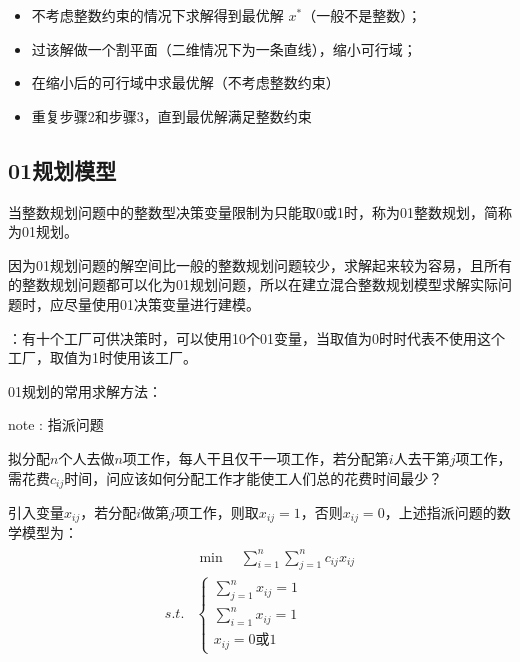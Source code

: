 \documentclass[letterpaper,10pt,english]{sphinxmanual}
\begin{document}
\begin{itemize}
\item {} 
不考虑整数约束的情况下求解得到最优解 \(x^*\)（一般不是整数）；

\item {} 
过该解做一个割平面（二维情况下为一条直线），缩小可行域；

\item {} 
在缩小后的可行域中求最优解（不考虑整数约束）

\item {} 
重复步骤2和步骤3，直到最优解满足整数约束

\end{itemize}



\subsection{0\sphinxhyphen{}1规划模型}
\label{\detokenize{docs/LP:id12}}
当整数规划问题中的整数型决策变量限制为只能取0或1时，称为0\sphinxhyphen{}1整数规划，简称为0\sphinxhyphen{}1规划。

因为0\sphinxhyphen{}1规划问题的解空间比一般的整数规划问题较少，求解起来较为容易，且所有的整数规划问题都可以化为0\sphinxhyphen{}1规划问题，所以在建立混合整数规划模型求解实际问题时，应尽量使用0\sphinxhyphen{}1决策变量进行建模。

：有十个工厂可供决策时，可以使用10个0\sphinxhyphen{}1变量，当取值为0时时代表不使用这个工厂，取值为1时使用该工厂。

0\sphinxhyphen{}1规划的常用求解方法：

\begin{sphinxadmonition}{note}{ : 指派问题}

拟分配\(n\)个人去做\(n\)项工作，每人干且仅干一项工作，若分配第\(i\)人去干第\(j\)项工作，需花费\(c_{ij}\)时间，问应该如何分配工作才能使工人们总的花费时间最少？
\end{sphinxadmonition}

 引入变量\(x_{ij}\)，若分配\(i\)做第\(j\)项工作，则取\(x_{ij} =1\)，否则\(x_{ij} = 0\)，上述指派问题的数学模型为：
\begin{equation*}
\begin{split}
\begin{aligned}
&{\min \quad \sum_{i=1}^{n} \sum_{j=1}^{n} c_{i j} x_{i j}}\\
s.t.&\left\{\begin{array}{ll}
{\displaystyle\sum_{j=1}^{n} x_{i j}=1} \\
{\displaystyle\sum_{i=1}^{n} x_{i j}=1} \\
{x_{i j}=0 或 1}
\end{array}\right.
\end{aligned}
\end{split}
\end{equation*}
\end{document}
